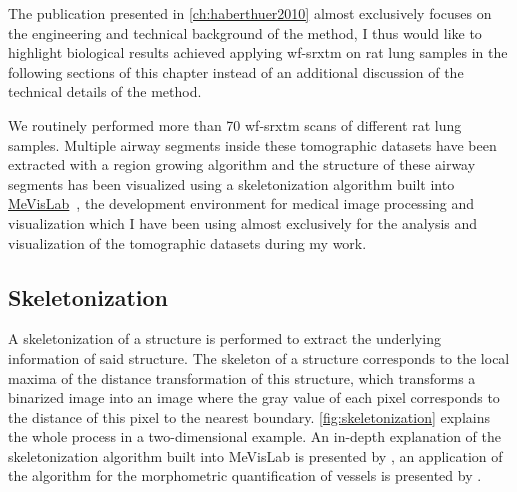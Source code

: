 The publication presented in \autoref{ch:haberthuer2010} almost exclusively focuses on the engineering and technical background of the method, I thus would like to highlight biological results achieved applying \ac{wf-srxtm} on rat lung samples in the following sections of this chapter instead of an additional discussion of the technical details of the method.

We routinely performed more than 70 \ac{wf-srxtm} scans of different rat lung samples. Multiple airway segments inside these tomographic datasets have been extracted with a region growing algorithm \cite{wiki:regiongrowing,Zucker1976} and the structure of these airway segments has been visualized using a skeletonization algorithm built into \href{http://mevislab.de/}{MeVisLab}~\cite{Bitter2007}, the development environment for medical image processing and visualization which I have been using almost exclusively for the analysis and visualization of the tomographic datasets during my work.

\subsection{Skeletonization}
A skeletonization of a structure is performed to extract the underlying information of said structure. The skeleton of a structure corresponds to the local maxima of the distance transformation of this structure, which transforms a binarized image into an image where the gray value of each pixel corresponds to the distance of this pixel to the nearest boundary. \autoref{fig:skeletonization} explains the whole process in a two-dimensional example. An in-depth explanation of the skeletonization algorithm built into MeVisLab is presented by \citet{Selle2002}, an application of the algorithm for the morphometric quantification of vessels is presented by \citet{Boskamp2004}.

